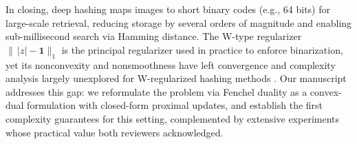 \documentclass[11pt]{article}
\newcommand{\blue}[1]{\textcolor{blue}{#1}}
\begin{document}




\bigskip

In closing, deep hashing maps images to short binary codes (e.g., 64 bits) for large-scale retrieval, reducing storage by several orders of magnitude and enabling
sub-millisecond search via Hamming distance. The W-type regularizer
$\|\,|z|-\mathbf{1}\|_1$ is the principal regularizer used in practice to enforce
binarization, yet its nonconvexity and nonsmoothness have left convergence and
complexity analysis largely unexplored for W-regularized hashing methods \cite{liu2016dsh,zhu2016dhn,wang2023mds,chen2025shc}. Our manuscript addresses
this gap: we reformulate the problem via Fenchel duality as a convex-dual formulation with
closed-form proximal updates, and establish the first complexity guarantees for
this setting, complemented by extensive experiments whose practical value both
reviewers acknowledged.
\end{document}
